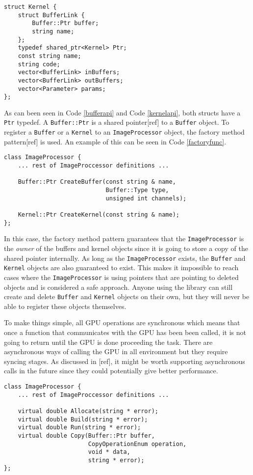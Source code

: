 \renewcommand{\lstlistingname}{Code}
\begin{lstlisting}[caption= Kernel struct, label=kernelapi]
struct Kernel {
    struct BufferLink {
        Buffer::Ptr buffer;
        string name;
    };
    typedef shared_ptr<Kernel> Ptr;
    const string name;
    string code;
    vector<BufferLink> inBuffers;
    vector<BufferLink> outBuffers;
    vector<Parameter> params;
};
\end{lstlisting}

As can been seen in Code \ref{bufferapi} and Code \ref{kernelapi}, both structs have a {\tt Ptr} typedef. A {\tt Buffer::Ptr} is a shared pointer[ref] to a {\tt Buffer} object. To register a {\tt Buffer} or a {\tt Kernel} to an {\tt ImageProcessor} object, the factory method pattern[ref] is used. An example of this can be seen in Code \ref{factoryfunc}.
\newline
\renewcommand{\lstlistingname}{Code}
\begin{lstlisting}[caption= Factory functions to create Buffer and Kernel objects, label=factoryfunc]
class ImageProcessor {
    ... rest of ImageProccessor definitions ...

    Buffer::Ptr CreateBuffer(const string & name,
                             Buffer::Type type,
                             unsigned int channels);

    Kernel::Ptr CreateKernel(const string & name);
};
\end{lstlisting}
In this case, the factory method pattern guarantees that the {\tt ImageProcessor} is the \emph{owner} of the buffers and kernel objects since it is going to store a copy of the shared pointer internally. As long as the {\tt ImageProcessor} exists, the {\tt Buffer} and {\tt Kernel} objects are also guaranteed to exist. This makes it impossible to reach cases where the {\tt ImageProcessor} is using pointers that are pointing to deleted objects and is considered a safe approach. Anyone using the library can still create and delete {\tt Buffer} and {\tt Kernel} objects on their own, but they will never be able to register these objects themselves.

To make things simple, all GPU operations are synchronous which means that once a function that communicates with the GPU has been been called, it is not going to return until the GPU is done proceeding the task. There are asynchronous ways of calling the GPU in all environment but they require syncing stages. As discussed in [ref], it might be worth supporting asynchronous calls in the future since they could potentially give better performance.
\newline
\renewcommand{\lstlistingname}{Code}
\begin{lstlisting}[caption= {\tt ImageProcessor} API for GPU operations, label=ipapi]
class ImageProcessor {
    ... rest of ImageProccessor definitions ...

    virtual double Allocate(string * error);
    virtual double Build(string * error);
    virtual double Run(string * error);
    virtual double Copy(Buffer::Ptr buffer,
                        CopyOperationEnum operation,
                        void * data,
                        string * error);
};
\end{lstlisting}

